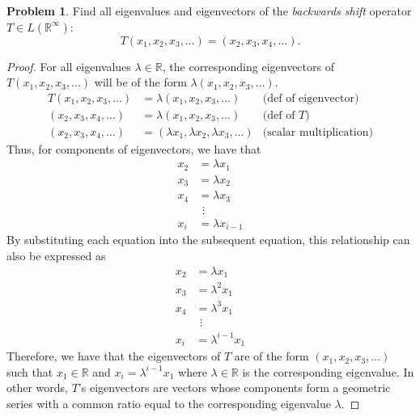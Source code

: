 \documentclass[12pt,reqno]{article}
\newcommand{\R}{\mathbb{R}}
\theoremstyle{definition}
\newtheorem{problem}{Problem}
\begin{document}
\newpage


\begin{problem} 
Find all eigenvalues and eigenvectors of the \emph{backwards shift} operator $T \in L(\mathbb{R}^\infty)$:
$$
T(x_1,x_2,x_3,\ldots) = (x_2,x_3,x_4, \ldots).
$$
\end{problem}

\begin{proof}
    For all eigenvalues $\lambda \in\R$, the corresponding eigenvectors of $T(x_1, x_2, x_3, \ldots)$ will be of the form $\lambda(x_1, x_2, x_3, \ldots)$.
    \begin{align*}
        T(x_1, x_2, x_3, \ldots) &= \lambda(x_1, x_2, x_3, \ldots) & \text{(def of eigenvector)}\\
        (x_2, x_3, x_4, \ldots) &= \lambda(x_1, x_2, x_3, \ldots) & \text{(def of $T$)}\\
        (x_2, x_3, x_4, \ldots) &= (\lambda x_1, \lambda x_2, \lambda x_3, \ldots) & \text{(scalar multiplication)}
    \end{align*}
    Thus, for components of eigenvectors, we have that
    \begin{align*}
        x_2 &= \lambda x_1\\
        x_3 &= \lambda x_2\\
        x_4 &= \lambda x_3\\
        &\ \, \vdots\\
        x_i &= \lambda x_{i-1}
    \end{align*}
    By substituting each equation into the subsequent equation, this relationship can also be expressed as
    \begin{align*}
        x_2 &= \lambda x_1\\
        x_3 &= \lambda^2 x_1\\
        x_4 &= \lambda^3 x_1\\
        &\ \, \vdots\\
        x_i &= \lambda^{i-1} x_1
    \end{align*}
    Therefore, we have that the eigenvectors of $T$ are of the form $(x_1, x_2, x_3, \ldots)$ such that $x_1\in\R$ and $x_i = \lambda^{i-1}x_1$ where $\lambda\in\R$ is the corresponding eigenvalue. In other words, $T$'s eigenvectors are vectors whose components form a geometric series with a common ratio equal to the corresponding eigenvalue $\lambda$.
\end{proof}
\end{document}

